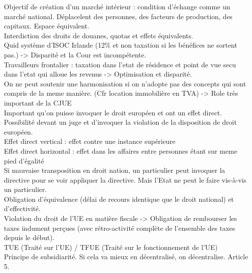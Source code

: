 \documentclass{book}
\begin{document}
Objectif de création d'un marché intérieur : condition d'échange comme un marché national. Déplacelent des personnes, des facteurs de production, des capitaux. Espace équivalent. \\

Interdiction des droits de douanes, quotas et effets équivalents.\\

Quid système d'ISOC Irlande (12\% et non taxation si les bénéfices ne sortent pas.) -> Disparité et la Cour est incompétente.\\

Travailleurs frontalier : taxation dans l'etat de résidence et point de vue secu dans l'etat qui alloue les revenus -> Optimisation et disparité.\\

On ne peut soutenir une harmonisation si on n'adopte pas des concepts qui sont compris de la meme manière. (Cfr location immobilière en TVA) -> Role très important de la CJUE\\

Important qu'on puisse invoquer le droit européen et ont un effet direct. Possibilité devant un juge et d'invoquer la violation de la disposition de droit européen.\\

Effet direct vertical : effet contre une instance supérieure\\

Effet direct horizontal : effet dans les affaires entre personnes étant sur meme pied d'égalité\\

Si mauvaise transposition en droit nation, un particulier peut invoquer la directive pour se voir appliquer la directive. Mais l'Etat ne peut le faire vis-à-vis un particulier.\\

Obligation d'équivalence (délai de recours identique que le droit national) et d'effectivité.\\

Violation du droit de l'UE en matière fiscale -> Obligation de rembourser les taxes indument perçues (avec rétro-activité complète de l'ensemble des taxes depuis le début).\\

TUE (Traité sur l'UE) / TFUE (Traité sur le fonctionnement de l'UE)\\

Principe de subsidiarité. Si cela va mieux en décentralisé, on décentralise. Article 5.
  


\nocite{*}

\end{document}

